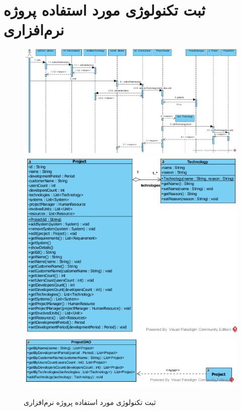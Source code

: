 \section{ثبت تکنولوژی مورد استفاده پروژه نرم‌افزاری}
\begin{figure}[H]
	\centering
	\includegraphics[scale=0.7]{img/sequence-design/AddTechnology}
	\includegraphics[scale=0.7]{img/sequence-design/AddTechnologyC}
	\includegraphics[scale=0.7]{img/sequence-design/AddTechnologyD}
	\caption{ثبت تکنولوژی مورد استفاده پروژه نرم‌افزاری}
\end{figure}

